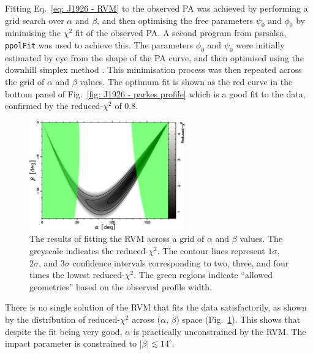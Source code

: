 Fitting Eq.~\eqref{eq: J1926 - RVM} to the observed PA was achieved by performing a grid search over $\alpha$ and $\beta$, and then optimising the free parameters $\psi_0$ and $\phi_0$ by minimising the $\chi^2$ fit of the observed PA. A second program from {\sc psrsalsa}, \texttt{ppolFit} was used to achieve this. The parameters $\phi_0$ and $\psi_0$ were initially estimated by eye from the shape of the PA curve, and then optimised using the downhill simplex method \citep{PTVF2007}. This minimisation process was then repeated across the grid of $\alpha$ and $\beta$ values. The optimum fit is shown as the red curve in the bottom panel of Fig.~\ref{fig: J1926 - parkes profile} which is a good fit to the data, confirmed by the reduced-$\chi^2$ of 0.8.
\begin{figure}
    \begin{center}
        \includegraphics[width=0.6\textwidth]{Figures/J1926/banana_plot}
        \caption[The goodness-of-fit of the RVM to the PSR~J1936$-$0652 PA curve]{The results of fitting the RVM across a grid of $\alpha$ and $\beta$ values. The greyscale indicates the reduced-$\chi^2$. The contour lines represent $1\sigma$, $2\sigma$, and $3\sigma$ confidence intervals corresponding to two, three, and four times the lowest reduced-$\chi^2$. The green regions indicate ``allowed geometries'' based on the observed profile width.}
        \label{fig: J1926 - banana plot}
    \end{center}
\end{figure}

There is no single solution of the RVM that fits the data satisfactorily, as shown by the distribution of reduced-$\chi^2$ across ($\alpha$, $\beta$) space (Fig.~\ref{fig: J1926 - banana plot}). This shows that despite the fit being very good, $\alpha$ is practically unconstrained by the RVM. The impact parameter is constrained to $|\beta| \lesssim 14^\circ$.

